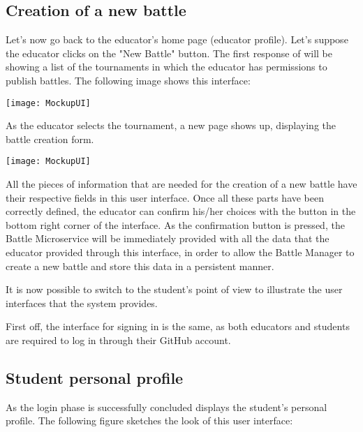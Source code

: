 \begin{minipage}{\linewidth}

\subsection{Creation of a new battle}

Let's now go back to the educator's home page (educator profile). Let's suppose the educator clicks on the "New Battle" button. The first response of \app will be showing a list of the tournaments in which the educator has permissions to publish battles. The following image shows this interface:

\begin{center}
	\texttt{[image: MockupUI]}
\end{center}

\end{minipage}

As the educator selects the tournament, a new page shows up, displaying the battle creation form.

\begin{center}
	\texttt{[image: MockupUI]}
\end{center}

All the pieces of information that are needed for the creation of a new battle have their respective fields in this user interface. Once all these parts have been correctly defined, the educator can confirm his/her choices with the button in the bottom right corner of the interface. 
As the confirmation button is pressed, the Battle Microservice will be immediately provided with all the data that the educator provided through this interface, in order to allow the Battle Manager to create a new battle and store this data in a persistent manner.

It is now possible to switch to the student's point of view to illustrate the user interfaces that the \app system provides.

First off, the interface for signing in \app is the same, as both educators and students are required to log in through their GitHub account.

\subsection{Student personal profile}
As the login phase is successfully concluded \app displays the student's personal profile. The following figure sketches the look of this user interface:

